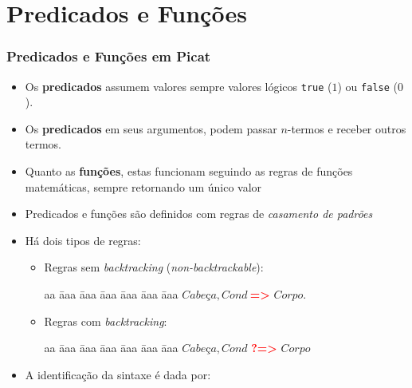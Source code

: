 \section{Predicados e Funções}


\begin{frame}[fragile,allowframebreaks=0.8,c]
	\frametitle{Predicados e Funções em Picat}
    
    \begin{itemize}

\item Os \textbf{predicados} assumem valores sempre valores lógicos \texttt{true} ($1$) ou \texttt{false} ($0$).

\item Os \textbf{predicados} em seus argumentos, podem passar $n$-termos e receber
outros termos.

\item Quanto as \textbf{funções}, estas funcionam seguindo as regras de funções matemáticas,
sempre retornando um único valor

        \item Predicados e funções são definidos com regras de \textit{casamento de padrões}
        
        
        \item Há dois tipos de regras:
        \pause
        \begin{itemize}
            \item Regras sem {\em backtracking} (\textit{non-backtrackable}):
        	
            \begin{tabbing}
              aa \= aaa \= aaa \= aaa \= aaa \= aaa \= aaa \kill
              \> \> $Cabeça, Cond\ $\textbf{\textcolor{red}{=>}} $Corpo$. 
            \end{tabbing}
            
            \pause
            \item Regras com {\em backtracking}:
            
            \begin{tabbing}
              aa \= aaa \= aaa \= aaa \= aaa \= aaa \= aaa \kill
              \> \> $Cabeça, Cond$ \textbf{\textcolor{red}{?=>}} $Corpo$ 
            \end{tabbing}
        
        \end{itemize}
        
        \item A identificação da sintaxe é dada por:
        

\end{itemize}
\end{frame}
